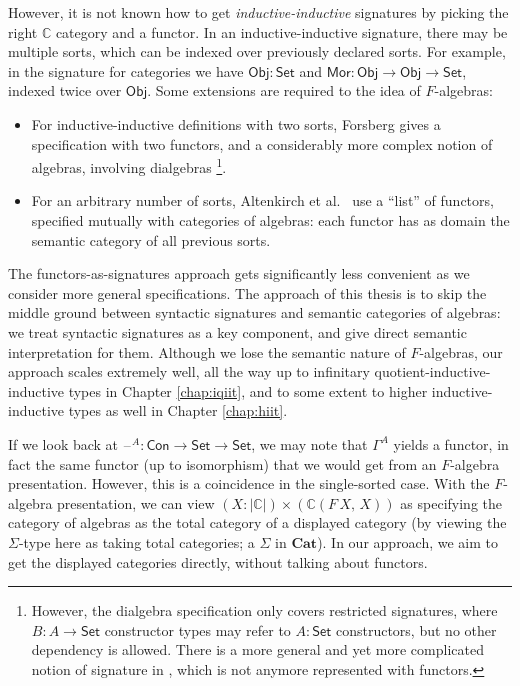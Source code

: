 \documentclass[12pt,a4paper,twoside,openany]{book}
\theoremstyle{remark}
\theoremstyle{definition}
\theoremstyle{theorem}
\newcommand{\ms}[1]{\mathsf{#1}}
\newcommand{\mbb}[1]{\mathbb{#1}}
\newcommand{\mbf}[1]{\mathbf{#1}}
\newcommand{\Con}{\mathsf{Con}}
\newcommand{\blank}{\mathord{\hspace{1pt}\text{--}\hspace{1pt}}}
\newcommand{\Set}{\mathsf{Set}}
\newcommand{\Mor}{\ms{Mor}}
\newcommand{\Obj}{\ms{Obj}}
\begin{document}
However, it is not known how to get \emph{inductive-inductive} signatures by
picking the right $\mbb{C}$ category and a functor. In an inductive-inductive
signature, there may be multiple sorts, which can be indexed over previously
declared sorts. For example, in the signature for categories we have $\Obj :
\Set$ and $\Mor : \Obj \to \Obj \to \Set$, indexed twice over $\Obj$. Some
extensions are required to the idea of $F$-algebras:
\begin{itemize}
\item
  For inductive-inductive definitions with two sorts, Forsberg gives a
  specification with two functors, and a considerably more complex notion of
  algebras, involving dialgebras \cite{forsberg-phd}\footnote{However, the
  dialgebra specification only covers restricted signatures, where $B : A \to
  \Set$ constructor types may refer to $A : \Set$ constructors, but no other
  dependency is allowed.  There is a more general and yet more complicated
  notion of signature in \cite{forsberg-phd}, which is not anymore represented
  with functors.}.
\item
  For an arbitrary number of sorts, Altenkirch et
  al.\ \cite{altenkirch18qiit} use a ``list'' of functors, specified mutually
  with categories of algebras: each functor has as domain the semantic category
  of all previous sorts.
\end{itemize}

The functors-as-signatures approach gets significantly less convenient as we
consider more general specifications. The approach of this thesis is to skip the
middle ground between syntactic signatures and semantic categories of algebras:
we treat syntactic signatures as a key component, and give direct semantic
interpretation for them. Although we lose the semantic nature of $F$-algebras,
our approach scales extremely well, all the way up to infinitary
quotient-inductive-inductive types in Chapter \ref{chap:iqiit}, and to some
extent to higher inductive-inductive types as well in Chapter \ref{chap:hiit}.

If we look back at $\blank^A : \Con \to \Set \to \Set$, we may note that
$\Gamma^A$ yields a functor, in fact the same functor (up to isomorphism) that
we would get from an $F$-algebra presentation. However, this is a coincidence in
the single-sorted case. With the $F$-algebra presentation, we can view $(X :
|\mbb{C}|) \times (\mbb{C}(F\,X,\,X))$ as specifying the category of algebras as
the total category of a displayed category (by viewing the $\Sigma$-type here as
taking total categories; a $\Sigma$ in $\mbf{Cat}$). In our approach, we aim to
get the displayed categories directly, without talking about functors.
\end{document}
